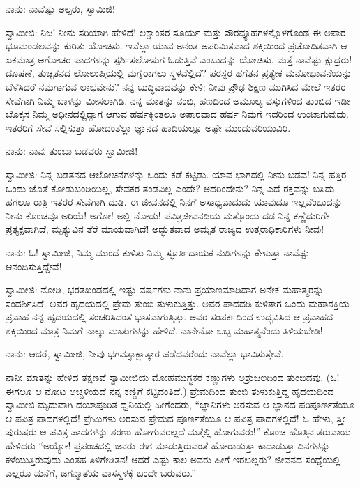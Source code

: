 ನಾನು: ನಾವೆಷ್ಟು ಅಲ್ಪರು, ಸ್ವಾಮಿಜಿ!

ಸ್ವಾಮೀಜಿ: ನಿಜ! ನೀನು ಸರಿಯಾಗಿ ಹೇಳಿದೆ! ಲಕ್ಷಾಂತರ ಸೂರ್ಯ ಮತ್ತು ಸೌರವ್ಯೂಹಗಳನ್ನೊಳಗೊಂಡ ಈ ಅಪಾರ ಭೂಮಂಡಲವನ್ನು ಕುರಿತು ಯೋಚಿಸು. ಇವೆಲ್ಲಾ ಯಾವ ಅನಂತ ಅಪರಿಮಿತವಾದ ಶಕ್ತಿಯಿಂದ ಪ್ರಚೋದಿತವಾಗಿ ಆ ಏಕಮಾತ್ರ ಅಗೋಚರ ಪಾದಗಳನ್ನು ಸ್ಪರ್ಶಿಸಲೋಸುಗ ಓಡುತ್ತಿವೆ ಎಂಬುದನ್ನು ಯೋಚಿಸು. ಮತ್ತೆ ನಾವೆಷ್ಟು ಕ್ಷುದ್ರರು! ದೂಷಣೆ, ತುಚ್ಛತನದ ಲೋಲುಪ್ತಿಯಲ್ಲಿ ಮಗ್ನರಾಗಲು ಸ್ಥಳವೆಲ್ಲಿದೆ? ಪರಸ್ಪರ ಹಗೆತನ ಪ್ರತ್ಯೇಕ ಮನೋಭಾವನೆಯನ್ನು ಬೆಳೆಸಿದರೆ ನಮಗಾಗುವ ಲಾಭವೇನು? ನನ್ನ ಬುದ್ಧಿವಾದವನ್ನು ಕೇಳಿ: ನೀವು ಪ್ರೌಢ ಶಿಕ್ಷಣ ಮುಗಿಸಿದ ಮೇಲೆ ಇತರರ ಸೇವೆಗಾಗಿ ನಿಮ್ಮ ಬಾಳನ್ನು ಮೀಸಲಾಗಿಡಿ. ನನ್ನ ಮಾತನ್ನು ನಂಬಿ, ಹಣದಿಂದ ಅಮೂಲ್ಯ ವಸ್ತುಗಳಿಂದ ತುಂಬಿದ ಇಡೀ ಬೊಕ್ಕಸ ನಿಮ್ಮ ಅಧೀನದಲ್ಲಿದ್ದಾಗ ಆಗುವ ಹರ್ಷಕ್ಕಿಂತಲೂ ಅಪಾರವಾದ ಹರ್ಷ ನಿಮಗೆ ಇದರಿಂದ ಉಂಟಾಗುವುದು. ಇತರರಿಗೆ ಸೇವೆ ಸಲ್ಲಿಸುತ್ತಾ ಹೋದಂತೆಲ್ಲಾ ಜ್ಞಾನದ ಹಾದಿಯಲ್ಲೂ ಅಷ್ಟೇ ಮುಂದುವರಿಯುವಿರಿ.

ನಾನು: ನಾವು ತುಂಬಾ ಬಡವರು ಸ್ವಾಮೀಜಿ!

ಸ್ವಾಮೀಜಿ: ನಿನ್ನ ಬಡತನದ ಆಲೋಚನೆಗಳನ್ನು ಒಂದು ಕಡೆ ಕಟ್ಟಿಡು. ಯಾವ ಭಾಗದಲ್ಲಿ ನೀನು ಬಡವ! ನಿನ್ನ ಹತ್ತಿರ ಒಂದು ಜೊತೆ ಕೋಡುಬಂಡಿಯಿಲ್ಲ, ಸೇವಕರ ತಂಡವಿಲ್ಲ ಎಂದೇ? ಅದರಿಂದೇನು? ನಿನ್ನ ಎದೆ ರಕ್ತವನ್ನು ಬಸಿದು ಹಗಲೂ ರಾತ್ರಿ ಇತರರ ಸೇವೆಗಾಗಿ ದುಡಿ. ಈ ಜೀವನದಲ್ಲಿ ನಿನಗೆ ಅಸಾಧ್ಯವಾದುದು ಯಾವುದೂ ಇಲ್ಲವೆಂಬುದನ್ನು ನೀನು ಕೊಂಚವೂ ಅರಿಯೆ! ಅಗೋ! ಅಲ್ಲಿ ನೋಡು! ಪವಿತ್ರಜೀವನದಿಯ ಮತ್ತೊಂದು ದಡ ನಿನ್ನ ಕಣ್ಣೆದುರಿಗೇ ಪ್ರತ್ಯಕ್ಷವಾಗಿದೆ, ಮೃತ್ಯುವಿನ ತೆರೆ ಮಾಯವಾಗಿದೆ! ಅದ್ಭುತವಾದ ಅಮೃತ ರಾಜ್ಯದ ಉತ್ತರಾಧಿಕಾರಿಗಳು ನೀವು!

ನಾನು: ಓ! ಸ್ವಾಮೀಜಿ, ನಿಮ್ಮ ಮುಂದೆ ಕುಳಿತು ನಿಮ್ಮ ಸ್ಫೂರ್ತಿದಾಯಕ ನುಡಿಗಳನ್ನು ಕೇಳುತ್ತಾ ನಾವೆಷ್ಟು ಆನಂದಿಸುತ್ತಿದ್ದೇವೆ!

ಸ್ವಾಮೀಜಿ: ನೋಡಿ, ಭರತಖಂಡದಲ್ಲಿ ಇಷ್ಟು ವರ್ಷಗಳು ನಾನು ಪ್ರಯಾಣಮಾಡಿದಾಗ ಅನೇಕ ಮಹಾತ್ಮರನ್ನು ಸಂದರ್ಶಿಸಿದೆ. ಅವರ ಹೃದಯದಲ್ಲಿ ಪ್ರೇಮ ತುಂಬಿ ತುಳುಕುತ್ತಿತ್ತು. ಅವರ ಪಾದದಡಿ ಕುಳಿತಾಗ ಒಂದು ಮಹಾಶಕ್ತಿಯ ಪ್ರವಾಹ ನನ್ನ ಹೃದಯದಲ್ಲಿ ಸಂಚರಿಸಿದಂತೆ ಭಾಸವಾಗುತ್ತಿತ್ತು. ಅವರ ಸಂಪರ್ಕದಿಂದ ಉದ್ಭವಿಸಿದ ಆ ಪ್ರವಾಹದ ಶಕ್ತಿಯಿಂದ ಮಾತ್ರ ನಿಮಗೆ ನಾಲ್ಕು ಮಾತುಗಳನ್ನು ಹೇಳಿದೆ. ನಾನೇನೋ ಒಬ್ಬ ಮಹಾತ್ಮನೆಂದು ತಿಳಿಯಬೇಡಿ!

ನಾನು: ಆದರೆ, ಸ್ವಾಮೀಜಿ, ನೀವು ಭಗವತ್ಸಾಕ್ಷಾತ್ಕಾರ ಪಡೆದವರೆಂದು ನಾವೆಲ್ಲಾ ಭಾವಿಸುತ್ತೇವೆ.

ನಾನೀ ಮಾತನ್ನು ಹೇಳಿದ ತಕ್ಷಣವೆ ಸ್ವಾಮೀಜಿಯ ಮೋಹಮುಗ್ಧಕರ ಕಣ್ಣುಗಳು ಅಶ್ರುಜಲದಿಂದ ತುಂಬಿದವು. (ಓ! ಈಗಲೂ ಆ ನೋಟ ಅಚ್ಚಳಿಯದೆ ನನ್ನ ಕಣ್ಣಿಗೆ ಕಟ್ಟಿದಂತಿದೆ.) ಪ್ರೇಮದಿಂದ ತುಂಬಿ ತುಳುಕುತ್ತಿದ್ದ ಹೃದಯದಿಂದ ಸ್ವಾಮೀಜಿ ಮೃದುವಾಗಿ ದಯಾಪೂರಿತ ಧ್ವನಿಯಲ್ಲಿ ಹೀಗೆಂದರು, “ಜ್ಞಾನಿಗಳು ಅರಸುವ ಆ ಜ್ಞಾನದ ಪರಿಪೂರ್ಣತೆಯೂ ಆ ಪವಿತ್ರ ಪಾದಗಳಲ್ಲಿದೆ! ಪ್ರೇಮಿಗಳು ಅರಸುವ ಪ್ರೇಮದ ಪೂರ್ಣತೆಯೂ ಆ ಪವಿತ್ರ ಪಾದಗಳಲ್ಲಿದೆ! ಓ ಹೇಳು, ಸ್ತ್ರೀ ಪುರುಷರು ಆ ಪವಿತ್ರ ಪಾದಗಳನ್ನು ಶರಣು ಹೋಗುವರಲ್ಲದೆ ಮತ್ತೆಲ್ಲಿ ಹೋಗುವರು!” ಕೊಂಚ ಹೊತ್ತಿನ ತರುವಾಯ ಹೇಳಿದರು “ಅಯ್ಯೋ! ಪ್ರಪಂಚದಲ್ಲಿ ಜನರು ಈಗ ಮಾಡುತ್ತಿರುವಂತೆ ಹೋರಾಡುತ್ತಾ ಕಾದಾಡುತ್ತಾ ದಿನಗಳನ್ನು ಕಳೆಯುತ್ತಿರುವುದು ಎಂತಹ ತಿಳಿಗೇಡಿತನ! ಆದರೆ ಎಷ್ಟು ಕಾಲ ಅವರು ಹೀಗೆ ಇರಬಲ್ಲರು? ಜೀವನದ ಸಂಧ್ಯೆಯಲ್ಲಿ ಎಲ್ಲರೂ ಮನೆಗೆ, ಜಗನ್ಮಾತೆಯ ವಾಸಸ್ಥಳಕ್ಕೆ ಬಂದೇ ಬರುವರು.”

